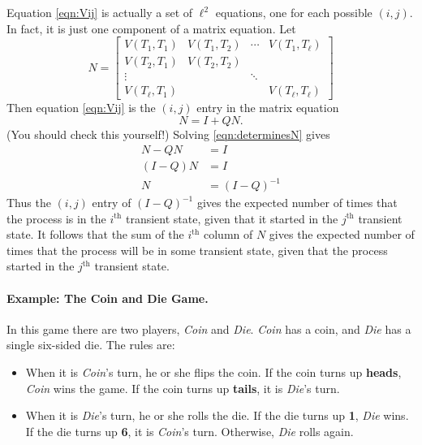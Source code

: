 \documentclass[reqno]{immbook}
\begin{document}
Equation \eqref{eqn:Vij} is actually a set of $\ell^2$ equations,
one for each possible $(i,j)$.  In fact, it is just one component
of a matrix equation.
Let
\begin{equation}
   N = \begin{bmatrix}
            V(T_1,T_1) & V(T_1,T_2) & \cdots & V(T_1,T_{\ell}) \\
	    V(T_2,T_1) & V(T_2,T_2) \\
	       \vdots  &  &   \ddots \\
	    V(T_{\ell},T_1) & & & V(T_{\ell},T_{\ell})
       \end{bmatrix}
\end{equation}
Then equation \eqref{eqn:Vij} is the $(i,j)$ entry in the
matrix equation
\begin{equation}
   N = I + QN.
\label{eqn:determinesN}
\end{equation}
(You should check this yourself!)
Solving \eqref{eqn:determinesN} gives
\begin{equation}
\begin{split}
  N-QN & = I \\
  (I-Q)N & = I \\
       N & = (I-Q)^{-1}
\end{split}
\end{equation}
Thus the $(i,j)$ entry of $(I-Q)^{-1}$ gives the expected number
of times that the process is in the $i^{\textrm{th}}$ transient
state, given that it started in the $j^{\textrm{th}}$
transient state.
It follows that the sum of the $i^{\textrm{th}}$ column of $N$
gives the expected number of times that the process will be in 
some transient state, given that the process started
in the $j^{\textrm{th}}$ transient state.

\paragraph{Example: The Coin and Die Game.}
In this game there are two players, \emph{Coin}
and \emph{Die}. \emph{Coin} has a coin, and \emph{Die} has a
single six-sided die. The rules are:

\begin{itemize}
\item
When it is \emph{Coin}'s turn, he or she flips the coin.
If the coin turns up \textbf{heads}, \emph{Coin} wins the game.
If the coin turns up \textbf{tails}, it is \emph{Die}'s turn.

\item
When it is \emph{Die}'s turn, he or she rolls the die.
If the die turns up \textbf{1}, \emph{Die} wins.
If the die turns up \textbf{6}, it is \emph{Coin}'s turn.
Otherwise, \emph{Die} rolls again.
\end{itemize}
\end{document}
